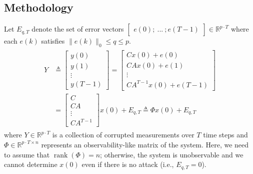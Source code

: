 \documentclass[../../thesis.tex]{subfiles}
\begin{document}

\subsection{Methodology}

Let $E_{q,T}$ denote the set of error vectors $\begin{bmatrix} e(0); ~ ...~  ;  e(T-1) \end{bmatrix}   \in  \mathbb{R}^{p\cdot T} $ where each $e(k)$ satisfies $\|e(k)\|_0 \leq q \leq p$. 
\begin{eqnarray} \label{eq:sys_err_corr}
\begin{aligned}
	Y &\triangleq \begin{bmatrix} y(0) \\ y(1) \\ \vdots \\ y(T-1) \end{bmatrix}  = \begin{bmatrix} Cx(0) + e(0)\\ CA x(0) + e(1) \\ \vdots \\ CA^{T-1} x(0) + e(T-1) \end{bmatrix} \\
		& =
		\begin{bmatrix} C \\ CA \\ \vdots \\ CA^{T-1} \end{bmatrix} x(0) + E_{q,T}  \triangleq \Phi x(0) + E_{q,T}
		\label{eq:decoder_Phi}
\end{aligned}
\end{eqnarray}
where $Y \in \mathbb{R}^{p\cdot T}$ is a collection of corrupted measurements over $T$ time steps and $\Phi \in \mathbb{R}^{p\cdot T \times n}$ represents an observability-like matrix of the system. 
Here, we need to assume that $\operatorname{rank}(\Phi) = n$; otherwise, the system is unobservable and we cannot determine $x(0)$ even if there is no attack (i.e., $E_{q,T} = 0$).
\end{document}
